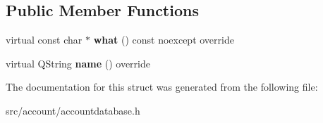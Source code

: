 \subsection*{Public Member Functions}
\begin{DoxyCompactItemize}
\item 
\mbox{\label{structInterfaceAccountDatabase_1_1AccountNotFoundException_a6283365bf82ec589999a2e88bf2b8b6d}} 
virtual const char $\ast$ {\bfseries what} () const noexcept override
\item 
\mbox{\label{structInterfaceAccountDatabase_1_1AccountNotFoundException_aa2d09d087a5cc970426c128b03eb92bd}} 
virtual Q\+String {\bfseries name} () override
\end{DoxyCompactItemize}


The documentation for this struct was generated from the following file\+:\begin{DoxyCompactItemize}
\item 
src/account/accountdatabase.\+h\end{DoxyCompactItemize}

